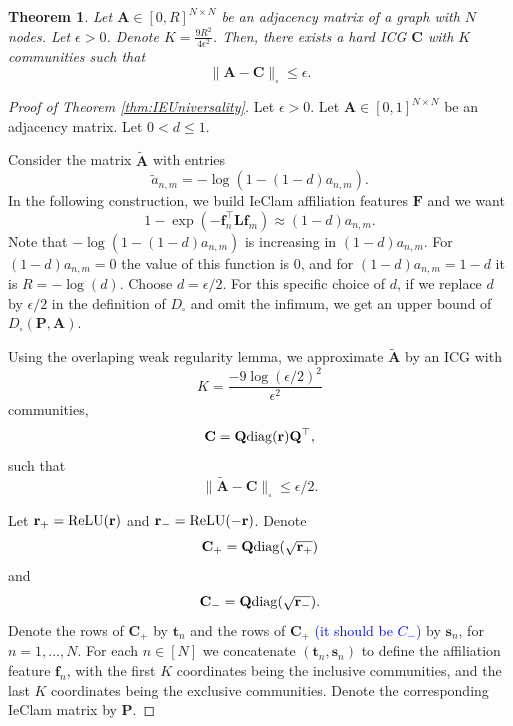 \documentclass[letterpaper]{article} %
\newtheorem{theorem}{Theorem}
\newcommand{\dan}[1]{{{\textcolor{blue}{ {#1}\textbf{}}}}}
\begin{document}
\begin{theorem}
\label{thm:reg_sprase}
     Let $\mathbf{A}\in[0,R]^{N\times N}$ be an adjacency matrix of a graph with $N$ nodes. Let $\epsilon>0$. Denote $K=\frac{9R^2}{4\epsilon^2}$. Then, there exists a hard ICG $\mathbf{C}$ with $K$ communities such that 
    \begin{equation}
        \label{eq:reg_sparse}
    \|\mathbf{A}-\mathbf{C}\|_{\square} \leq \epsilon.
    \end{equation}
\end{theorem}

\begin{proof}[Proof of Theorem \ref{thm:IEUniversality}]
 Let $\epsilon>0$. Let $\mathbf{A}\in[0,1]^{N\times N}$ be an adjacency matrix. Let $0<d\leq 1$.

Consider the matrix  $\tilde{\mathbf{A}}$ with entries
\[\tilde{a}_{n,m}=-\log(1-(1-d)a_{n,m}).\]
In the following construction, we build IeClam affiliation features $\mathbf{F}$ and we want
\[1-\exp(-\mathbf{f}_n^{\top}\mathbf{L}\mathbf{f}_m)\approx (1-d)a_{n,m}.\]
Note that $-\log(1-(1-d)a_{n,m})$ is increasing in $(1-d)a_{n,m}$. For $(1-d)a_{n,m}=0$ the value of this function is 0, and for $(1-d)a_{n,m}=1-d$ it is $R=-\log(d)$. Choose $d=\epsilon/2$. For this specific choice of $d$, if we replace $d$ by $\epsilon/2$ in the definition of $D_{\square}$ and omit the infimum, we get an upper bound of $D_{\square}(\mathbf{P},\mathbf{A})$.
 



Using the overlaping weak regularity lemma, we approximate $\tilde{\mathbf{A}}$ by an ICG with 
\[K=\frac{-9\log(\epsilon/2)^2}{\epsilon^2}\]
communities,
\[\mathbf{C}= \mathbf{Q}{\rm diag}(\mathbf{r})\mathbf{Q}^{\top },\]
such that
\[\|\tilde{\mathbf{A}}-\mathbf{C}\|_{\square} \leq \epsilon/2.\]

Let $\mathbf{r}_+={\rm ReLU}(\mathbf{r})$ and $\mathbf{r}_-={\rm ReLU}(-\mathbf{r})$. Denote
\[\mathbf{C}_+=\mathbf{Q}{\rm diag}(\sqrt{\mathbf{r}_+})\]
and
\[\mathbf{C}_-=\mathbf{Q}{\rm diag}(\sqrt{\mathbf{r}_-}).\]
Denote the rows of $\mathbf{C}_+$ by $\mathbf{t}_n$ and the rows of $\mathbf{C}_+$ \dan{(it should be $C_-$)} by $\mathbf{s}_n$, for $n=1,\ldots,N$. For each $n\in[N]$ we concatenate $(\mathbf{t}_n,\mathbf{s}_n)$ to define the affiliation feature $\mathbf{f}_n$, with the first $K$ coordinates being the inclusive communities, and the last $K$ coordinates being the exclusive communities. Denote the corresponding IeClam matrix by $\mathbf{P}$.


\end{proof}
\end{document}
